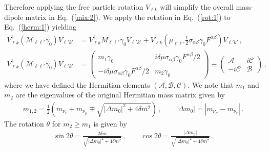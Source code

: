 \documentclass[addchapnum]{ws-rv961x669} %
\newcommand{\req}[1]{Eq.~(\ref{#1})}
\begin{document}
Therefore applying the free particle rotation $V_{\ell k}$ will simplify the overall mass-dipole matrix in \req{mix:2}. We apply the rotation in \req{rot:1} to \req{herm:1} yielding
\begin{align}
    \label{herm:2}
    V_{\ell k}^{\dag}(\mathcal{M}_{\ell\ell'}\gamma_{0})V_{\ell' k'} &= 
    V_{\ell k}^{\dag}M_{\ell\ell'}\gamma_{0}V_{\ell' k'} +
    V_{\ell k}^{\dag}(\mu_{\ell\ell'}\frac{1}{2}\sigma_{\alpha\beta}\gamma_{0}F^{\alpha\beta})V_{\ell' k'}\,,\\
    \label{herm:3}
    V_{\ell k}^{\dag}(\mathcal{M}_{\ell\ell'}\gamma_{0})V_{\ell' k'} &= 
	\begin{pmatrix}
        m_{1}\gamma_{0} & i\delta\mu\sigma_{\alpha\beta}\gamma_{0}F^{\alpha\beta}/2\\
        -i\delta\mu\sigma_{\alpha\beta}\gamma_{0}F^{\alpha\beta}/2 & m_{2}\gamma_{0}
	\end{pmatrix}\equiv
    \begin{pmatrix}
        \mathcal{A} & i\mathcal{C}\\
        -i\mathcal{C} & \mathcal{B}
    \end{pmatrix}\,,
\end{align}
where we have defined the Hermitian elements $(\mathcal{A},\mathcal{B},\mathcal{C})$. We note that $m_{1}$ and $m_{2}$ are the eigenvalues of the original Hermitian mass matrix given by
\begin{align}
    \label{massroot:1}
    m_{1,2}=\frac{1}{2}\left(m_{\nu_{e}}+m_{\nu_{\mu}}\mp\sqrt{|\Delta m_{0}|^{2}+4\delta m^{2}}\right)\,,\qquad
    |\Delta m_{0}|=|m_{\nu_{\mu}}-m_{\nu_{e}}|\,.
\end{align}
The rotation $\theta$ for $m_{2}\geq m_{1}$ is given by
\begin{align}
    \label{massroot:2}
    \sin2\theta=\frac{2\delta m}{\sqrt{|\Delta m_{0}|^{2}+4\delta m^{2}}}\,,\qquad
    \cos2\theta=\frac{|\Delta m_{0}|}{\sqrt{|\Delta m_{0}|^{2}+4\delta m^{2}}}\,.
\end{align}
\end{document}
